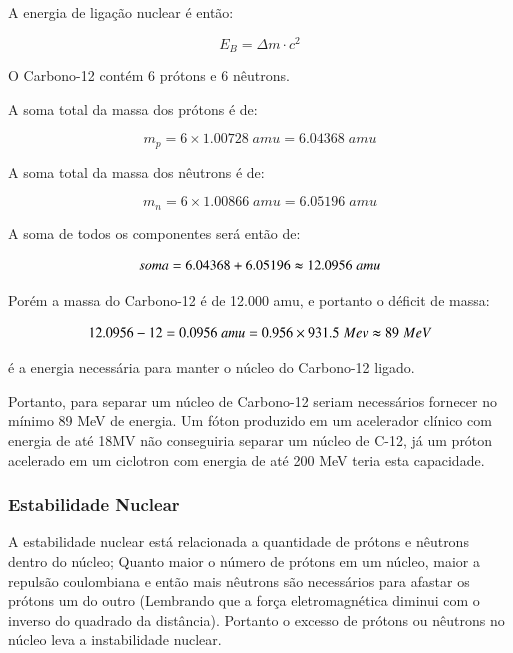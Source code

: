 \documentclass[11pt,a4paper]{article}
\newcounter{exemplo}
\begin{document}
    A energia de ligação nuclear é então:

        \begin{equation}
            E_B = \Delta m \cdot c^2
        \end{equation}

		\begin{exemplo}
                    
			O Carbono-12 contém 6 prótons e 6 nêutrons. 
			
			A soma total da massa dos prótons é de:

			$$m_p = 6 \times 1.00728 \; amu = 6.04368 \; amu$$

			A soma total da massa dos nêutrons é de:

			$$m_n = 6 \times 1.00866 \; amu = 6.05196 \; amu$$

			A soma de todos os componentes será então de: 

			$$soma = 6.04368 + 6.05196 \thickapprox  12.0956 \; amu$$

			Porém a massa do Carbono-12 é de 12.000 amu, e portanto o déficit de massa:

			$$12.0956 - 12 = 0.0956 \; amu = 0.956 \times 931.5 \; Mev \thickapprox 89 \;  MeV$$ 

			é a energia necessária para manter o núcleo do Carbono-12 ligado.
		\end{exemplo}            
               

    Portanto, para separar um núcleo de Carbono-12 seriam necessários fornecer no mínimo 89 MeV de energia. Um fóton produzido em um acelerador clínico com energia de até 18MV não conseguiria separar um núcleo de C-12, já um próton acelerado em um ciclotron com energia de até 200 MeV teria esta capacidade. 
        
\subsubsection*{Estabilidade Nuclear}
                
    A estabilidade nuclear está relacionada a quantidade de prótons e nêutrons dentro do núcleo; Quanto maior o número de prótons em um núcleo, maior a repulsão coulombiana e então mais nêutrons são necessários para afastar os prótons um do outro (Lembrando que a força eletromagnética diminui com o inverso do quadrado da distância). Portanto o excesso de prótons ou nêutrons no núcleo leva a instabilidade nuclear.
                
\end{document}
